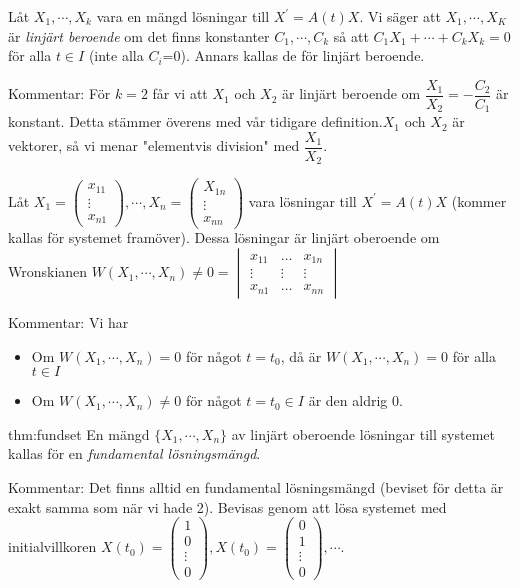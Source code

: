 \begin{theo}
  Låt $X_1,\cdots, X_k$ vara en mängd lösningar till $X^{\prime}=A(t)X$. Vi säger att $X_1, \cdots, X_K$ är \textit{linjärt beroende} om det finns konstanter $C_1,\cdots, C_k$ så att $C_1X_1+\cdots+C_kX_k=0$ för alla $t\in I$ (inte alla $C_i$=0). Annars kallas de för linjärt beroende.
\end{theo}
\par\bigskip
\noindent Kommentar: För $k=2$ får vi att $X_1$ och $X_2$ är linjärt beroende om $\dfrac{X_1}{X_2}=-\dfrac{C_2}{C_1}$ är konstant. Detta stämmer överens med vår tidigare definition.$X_1$ och $X_2$ är vektorer, så vi menar "elementvis division" med $\dfrac{X_1}{X_2}$.
\par\bigskip
\noindent Låt $X_1 = \begin{pmatrix}x_{11}\\\vdots\\x_{n1}\end{pmatrix},\cdots, X_n = \begin{pmatrix}X_{1n}\\\vdots\\x_{nn}\end{pmatrix}$ vara lösningar till $X^{\prime}=A(t)X$ (kommer kallas för systemet framöver). Dessa lösningar är linjärt oberoende om Wronskianen $W(X_1,\cdots, X_n) \neq 0 = \begin{vmatrix}x_{11}&\hdots&x_{1n}\\\vdots&\vdots&\vdots\\x_{n1}&\hdots&x_{nn}\end{vmatrix}$ 
\par\bigskip
\noindent Kommentar: Vi har
\begin{itemize}
  \item Om $W(X_1,\cdots, X_n) = 0$ för något $t=t_0$, då är $W(X_1,\cdots, X_n)=0$ för alla $t\in I$
  \item Om $W(X_1,\cdots, X_n)\neq0$ för något $t=t_0\in I$ är den aldrig 0.
\end{itemize}
\par\bigskip
\begin{theo}{thm:fundset}
  En mängd $\{X_1, \cdots, X_n\}$ av linjärt oberoende lösningar till systemet kallas för en \textit{fundamental lösningsmängd}.
\end{theo}
\par\bigskip
\noindent Kommentar: Det finns alltid en fundamental lösningsmängd (beviset för detta är exakt samma som när vi hade 2). Bevisas genom att lösa systemet med initialvillkoren $X(t_0)=\begin{pmatrix}1\\0\\\vdots\\0\end{pmatrix}, X(t_0) = \begin{pmatrix}0\\1\\\vdots\\0\end{pmatrix},\cdots$.\par

